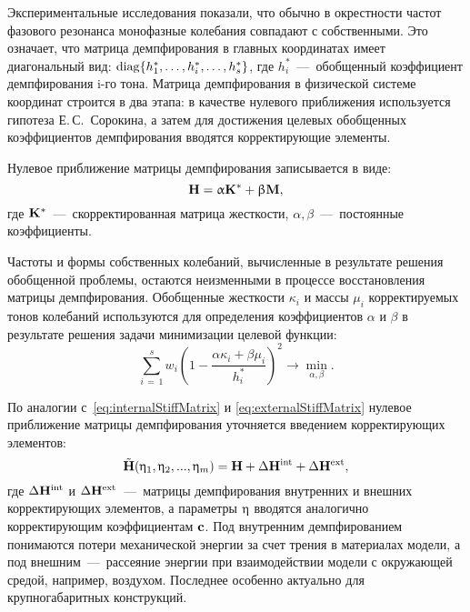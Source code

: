 Экспериментальные исследования показали, что обычно в окрестности частот фазового резонанса монофазные колебания совпадают с собственными. Это означает, что матрица демпфирования в главных координатах имеет диагональный вид: $ \operatorname{diag} \{ h_1 ^ \ast, \hdots, h_i ^ \ast, \hdots, h_s ^ \ast \} $, где $ h_i ^ \ast $~---~обобщенный коэффициент демпфирования i-го тона. Матрица демпфирования в физической системе координат строится в два этапа: в качестве нулевого приближения используется гипотеза Е.\,С.~Сорокина, а затем для достижения целевых обобщенных коэффициентов демпфирования вводятся корректирующие элементы.

Нулевое приближение матрицы демпфирования записывается в виде:
\begin{equation}
	\mathbf{H} = \upalpha \mathbf{K} ^ \ast + \upbeta \mathbf{M},
\end{equation}
где $ \mathbf{K} ^ \ast $~---~скорректированная матрица жесткости, $ \alpha, \beta $~---~постоянные коэффициенты.

Частоты и формы собственных колебаний, вычисленные в результате решения обобщенной проблемы, остаются неизменными в процессе восстановления матрицы демпфирования. Обобщенные жесткости $ \kappa_i $ и массы $ \mu_i $ корректируемых тонов колебаний используются для определения коэффициентов $ \alpha $ и $ \beta $ в результате решения задачи минимизации целевой функции:
\begin{equation}
	\sum \limits_{i\,=\,1} ^ s w_i \left( 1 - \frac{\alpha \kappa_i + \beta \mu_i}{h_i ^ \ast} \right)^2 \rightarrow \min_{\alpha, \beta}.
\end{equation}

По аналогии с~\eqref{eq:internalStiffMatrix} и \eqref{eq:externalStiffMatrix} нулевое приближение матрицы демпфирования уточняется введением корректирующих элементов:
\begin{equation}
	\tilde{\mathbf{H}}(\upeta_1, \upeta_2, ..., \upeta_m) = \mathbf{H} + \Delta \mathbf{H} ^ {\text{int}} + \Delta \mathbf{H} ^ {\text{ext}},
\end{equation}
где $ \Delta \mathbf{H} ^ {\text{int}} $ и $ \Delta \mathbf{H} ^ {\text{ext}} $~---~матрицы демпфирования внутренних и внешних корректирующих элементов, а параметры $ \mathbf{\upeta} $ вводятся аналогично корректирующим коэффициентам $ \mathbf{c} $. Под внутренним демпфированием понимаются потери механической энергии за счет трения в материалах модели, а под внешним~---~рассеяние энергии при взаимодействии модели с окружающей средой, например, воздухом. Последнее особенно актуально для крупногабаритных конструкций.

